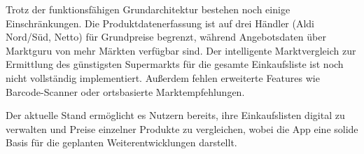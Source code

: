 Trotz der funktionsfähigen Grundarchitektur bestehen noch einige Einschränkungen. Die Produktdatenerfassung ist auf drei Händler (Aldi Nord/Süd, Netto) für Grundpreise begrenzt, während Angebotsdaten über Marktguru von mehr Märkten verfügbar sind. Der intelligente Marktvergleich zur Ermittlung des günstigsten Supermarkts für die gesamte Einkaufsliste ist noch nicht vollständig implementiert. Außerdem fehlen erweiterte Features wie Barcode-Scanner oder ortsbasierte Marktempfehlungen.

Der aktuelle Stand ermöglicht es Nutzern bereits, ihre Einkaufslisten digital zu verwalten und Preise einzelner Produkte zu vergleichen, wobei die App eine solide Basis für die geplanten Weiterentwicklungen darstellt.